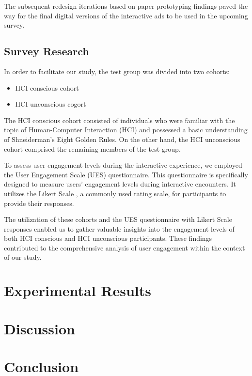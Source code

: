 \documentclass[journal]{IEEEtran}
\begin{document}
The subsequent redesign iterations based on paper prototyping findings paved the way for the final
digital versions of the interactive ads to be used in the upcoming survey.

\subsection{Survey Research}

In order to facilitate our study, the test group was divided into two cohorts:
\begin{itemize}
    \item HCI conscious cohort
    \item HCI unconscious cogort
\end{itemize}
The HCI conscious cohort consisted of individuals who were familiar with the
topic of Human-Computer Interaction (HCI) and possessed a basic understanding
of Shneiderman's Eight Golden Rules. On the other hand, the HCI unconscious
cohort comprised the remaining members of the test group.

To assess user engagement levels during the interactive experience, we employed
the User Engagement Scale (UES) questionnaire. This questionnaire is specifically
designed to measure users' engagement levels during interactive encounters. \cite{obrien2008user}
It utilizes the Likert Scale \cite{likert1932technique}, a commonly used rating scale, for participants
to provide their responses.

The utilization of these cohorts and the UES questionnaire with Likert Scale
responses enabled us to gather valuable insights into the engagement levels
of both HCI conscious and HCI unconscious participants. These findings contributed
to the comprehensive analysis of user engagement within the context of our study.

\section{Experimental Results}

\section{Discussion}

\section{Conclusion}
\end{document}
